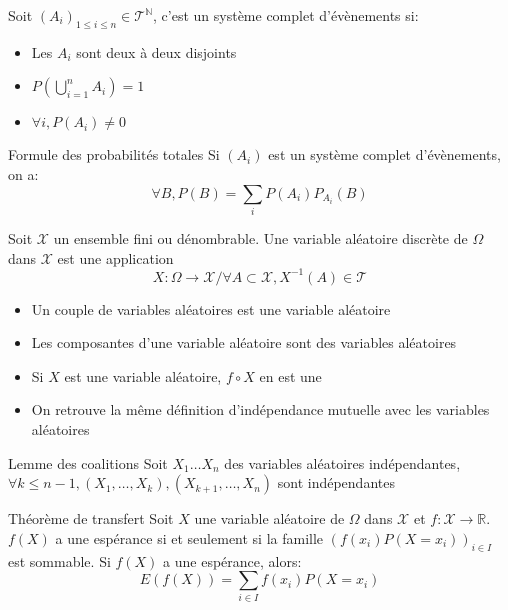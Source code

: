 \documentclass[french, a4paper, 10pt, twocolumn]{article}
\newcommand{\N}{\mathbb{N}}   %
\newcommand{\R}{\mathbb{R}}   %
\begin{document}
\begin{definition}
  Soit \((A_i)_{1 \leqslant i \leqslant n} \in \mathcal{T}^{\N}\), c'est un système complet d'évènements si:
  \begin{itemize}
    \item Les \(A_i\) sont deux à deux disjoints
    \item \(P\left(\bigcup_{i=1}^{n}A_i\right)=1\)
    \item \(\forall i, P(A_i)\neq 0\)
  \end{itemize}
\end{definition}

\begin{theoreme}{Formule des probabilités totales}
  Si $(A_i)$ est un système complet d'évènements, on a:
    \[\forall B, P(B)=\sum_{i}P(A_i)P_{A_i}(B)\]
\end{theoreme}

\begin{definition}
  Soit \(\mathcal{X}\) un ensemble fini ou dénombrable.
  Une variable aléatoire discrète de \(\Omega\) dans \(\mathcal{X}\) est une application
  \[X: \Omega \rightarrow \mathcal{X} / \forall A \subset \mathcal{X}, X^{-1}(A) \in \mathcal{T}\]

  \tcblower
  \begin{itemize}
    \item Un couple de variables aléatoires est une variable aléatoire
    \item Les composantes d'une variable aléatoire sont des variables aléatoires
    \item Si \(X\) est une variable aléatoire, \(f\circ X\) en est une
    \item On retrouve la même définition d'indépendance mutuelle avec les variables aléatoires
  \end{itemize}
\end{definition}

\begin{theoreme}{Lemme des coalitions}
  Soit \(X_1\dots X_n\) des variables aléatoires indépendantes,
  \(\forall k \leqslant n-1, (X_1,\dots,X_k),(X_{k+1},\dots,X_n)\) sont indépendantes
\end{theoreme}

\begin{theoreme}{Théorème de transfert}
  Soit \(X\) une variable aléatoire de \(\Omega\) dans \(\mathcal{X}\) et \(f: \mathcal{X} \rightarrow \R\).
  \(f(X)\) a une espérance si et seulement si la famille \((f(x_i)P(X=x_i))_{i\in I}\) est sommable.
  Si \(f(X)\) a une espérance, alors:
  \[E(f(X))=\sum_{i\in I}f(x_i)P(X=x_i)\]
\end{theoreme}
\end{document}
